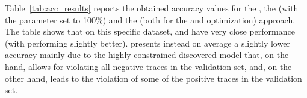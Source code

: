 Table~\ref{tab:acc_results} reports the obtained accuracy values for the \decminer, the \declareminer (with the  parameter set to 100\%) and the \nd (both for the \minclos and \subsetclos optimization) approach. The table shows that on this specific dataset, \nd and \decminer have very close performance (with \nd \minclos performing slightly better). \declareminer presents instead on average a slightly lower accuracy mainly due to the highly constrained discovered model that, on the hand, allows for violating all negative traces in the validation set, and, on the other hand, leads to the violation of some of the positive traces in the validation set.

\begin{table} [h]
	\centering
		\caption{Accuracy results obtained with \declareminer, \decminer and \nd}
		\label{tab:acc_results}
\end{table}


